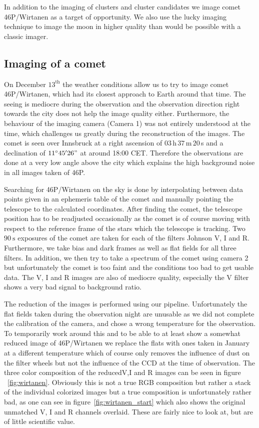\documentclass{article}
\begin{document}
In addition to the imaging of clusters and cluster candidates we image comet 46P/Wirtanen as a target of opportunity. We also use the lucky imaging technique to image the moon in higher quality than would be possible with a classic imager.

\subsection{Imaging of a comet}

On December $13^\text{th}$ the weather conditions allow us to try to image comet 46P/Wirtanen, which had its closest approach to Earth around that time. The seeing is mediocre during the observation and the observation direction right towards the city does not help the image quality either. Furthermore, the behaviour of the imaging camera (Camera 1) was not entirely understood at the time, which challenges us greatly during the reconstruction of the images.
The comet is seen over Innsbruck at a right ascension of $\num{03}\,$h$\,\num{37}\,$m$\,\num{20}\,$s and a declination of $\SI{11}{\degree} \num{45}'\num{26}"$ at around 18:00 CET. Therefore the observations are done at a very low angle above the city which explains the high background noise in all images taken of 46P.

Searching for 46P/Wirtanen on the sky is done by interpolating between data points given in an ephemeris table \parencite{wirtanen} of the comet and manually pointing the telescope to the calculated coordinates. After finding the comet, the telescope position has to be readjusted occasionally as the comet is of course moving with respect to the reference frame of the stars which the telescope is tracking. Two $\SI{90}{\second}$ exposures of the comet are taken for each of the filters Johnson V, I and R. Furthermore, we take bias and dark frames as well as flat fields for all three filters. In addition, we then try to take a spectrum of the comet using camera 2 but unfortunately the comet is too faint and the conditions too bad to get usable data. The V, I and R images are also of mediocre quality, especially the V filter shows a very bad signal to background ratio. 

The reduction of the images is performed using our pipeline. Unfortunately the flat fields taken during the observation night are unusable as we did not complete the calibration of the camera, and chose a wrong temperature for the observation. To temporarily work around this and to be able to at least show a somewhat reduced image of 46P/Wirtanen we replace the flats with ones taken in January at a different temperature which of course only removes the influence of dust on the filter wheels but not the influence of the CCD at the time of observation. The three color composition of the \ldq reduced\rdq V,I and R images can be seen in figure ~\ref{fig:wirtanen}. Obviously this is not a true RGB composition but rather a stack of the individual colorized images but a true composition is unfortunately rather bad, as one can see in figure~\ref{fig:wirtanen_start} which also shows the original unmatched V, I and R channels overlaid. These are fairly nice to look at, but are of little scientific value.
\end{document}
